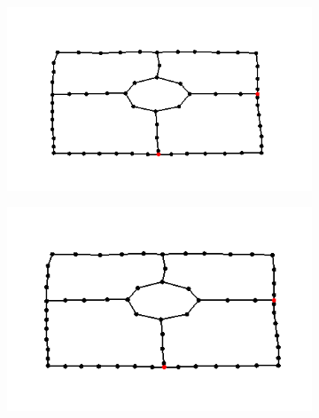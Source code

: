 \documentclass[11pt]{article}
\begin{document}
\begin{figure}[h]
\centering
  \begin{subfigure}{0.4\linewidth}
  \centering
  \graphicspath{ {images/}}
  \includegraphics[width=\linewidth]{roundabout165_165}
  \end{subfigure}
    \begin{subfigure}{0.4\linewidth}
  \centering
  \graphicspath{ {images/}}
  \includegraphics[width=\linewidth]{roundabout167_170}
  \end{subfigure}
\end{figure}
\end{document}
